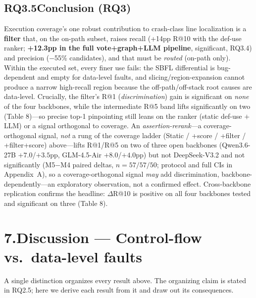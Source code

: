 \documentclass[11pt]{article}
\begin{document}
\subsection*{RQ3.5\quad Conclusion (RQ3)}
Execution coverage's one robust contribution to crash-class line localization is a \textbf{filter} that, on the on-path subset, raises recall (+14pp R@10 with the def-use ranker; \textbf{+12.3pp in the full vote+graph+LLM pipeline}, significant, RQ3.4) and precision ($-$55\% candidates), and that must be \emph{routed} (on-path only). Within the executed set, every finer use fails: the SBFL differential is bug-dependent and empty for data-level faults, and slicing/region-expansion cannot produce a narrow high-recall region because the off-path/off-stack root causes are data-level. Crucially, the filter's R@1 (\emph{discrimination}) gain is significant on \emph{none} of the four backbones, while the intermediate R@5 band lifts significantly on two (Table 8)---so precise top-1 pinpointing still leans on the ranker (static def-use $+$ LLM) or a signal orthogonal to coverage. An \emph{assertion-rerank}---a coverage-orthogonal signal, \emph{not} a rung of the coverage ladder (Static / +score / +filter / +filter+score) above---lifts R@1/R@5 on two of three open backbones (Qwen3.6-27B $+7.0$/$+3.5$pp, GLM-4.5-Air $+8.0$/$+4.0$pp) but not DeepSeek-V3.2 and not significantly (M5$-$M4 paired deltas, $n{=}57/57/50$; protocol and full CIs in Appendix~A), so a coverage-orthogonal signal \emph{may} add discrimination, backbone-dependently---an exploratory observation, not a confirmed effect. Cross-backbone replication confirms the headline: $\Delta$R@10 is positive on all four backbones tested and significant on three (Table 8).

\section*{7.\quad Discussion --- Control-flow vs.\ data-level faults}

A single distinction organizes every result above. The organizing claim is stated in RQ2.5; here we derive each result from it and draw out its consequences.
\end{document}
